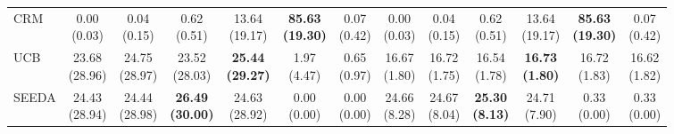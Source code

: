 {\begin{tabular}{l|cccccc|cccccc}
CRM & {\cellcolor[HTML]{C8E6C9}} \makecell{0.00 \\ (0.03)} & \makecell{0.04 \\ (0.15)} & \makecell{0.62 \\ (0.51)} & \makecell{13.64 \\ (19.17)} & \bfseries \makecell{85.63 \\ (19.30)} & \makecell{0.07 \\ (0.42)} & {\cellcolor[HTML]{C8E6C9}} \makecell{0.00 \\ (0.03)} & \makecell{0.04 \\ (0.15)} & \makecell{0.62 \\ (0.51)} & \makecell{13.64 \\ (19.17)} & \bfseries \makecell{85.63 \\ (19.30)} & \makecell{0.07 \\ (0.42)} \\
UCB & {\cellcolor[HTML]{C8E6C9}} \makecell{23.68 \\ (28.96)} & \makecell{24.75 \\ (28.97)} & \makecell{23.52 \\ (28.03)} & \bfseries \makecell{25.44 \\ (29.27)} & \makecell{1.97 \\ (4.47)} & \makecell{0.65 \\ (0.97)} & {\cellcolor[HTML]{C8E6C9}} \makecell{16.67 \\ (1.80)} & \makecell{16.72 \\ (1.75)} & \makecell{16.54 \\ (1.78)} & \bfseries \makecell{16.73 \\ (1.80)} & \makecell{16.72 \\ (1.83)} & \makecell{16.62 \\ (1.82)} \\
SEEDA & {\cellcolor[HTML]{C8E6C9}} \makecell{24.43 \\ (28.94)} & \makecell{24.44 \\ (28.98)} & \bfseries \makecell{26.49 \\ (30.00)} & \makecell{24.63 \\ (28.92)} & \makecell{0.00 \\ (0.00)} & \makecell{0.00 \\ (0.00)} & {\cellcolor[HTML]{C8E6C9}} \makecell{24.66 \\ (8.28)} & \makecell{24.67 \\ (8.04)} & \bfseries \makecell{25.30 \\ (8.13)} & \makecell{24.71 \\ (7.90)} & \makecell{0.33 \\ (0.00)} & \makecell{0.33 \\ (0.00)} \\

\end{tabular}}
